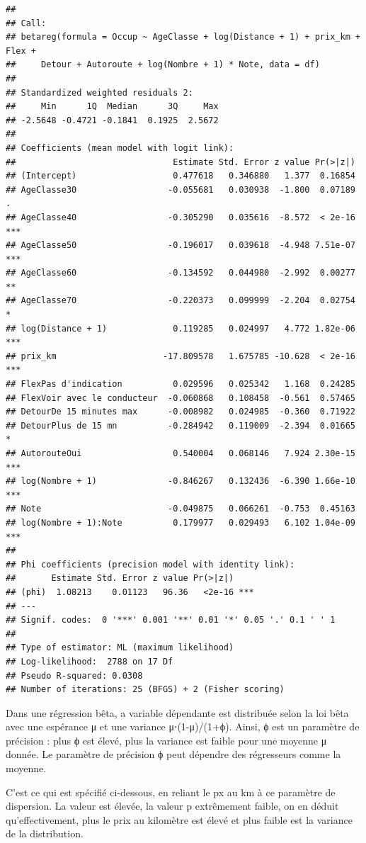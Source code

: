 \documentclass[
]{book}
\begin{document}
\begin{verbatim}
## 
## Call:
## betareg(formula = Occup ~ AgeClasse + log(Distance + 1) + prix_km + Flex + 
##     Detour + Autoroute + log(Nombre + 1) * Note, data = df)
## 
## Standardized weighted residuals 2:
##     Min      1Q  Median      3Q     Max 
## -2.5648 -0.4721 -0.1841  0.1925  2.5672 
## 
## Coefficients (mean model with logit link):
##                               Estimate Std. Error z value Pr(>|z|)    
## (Intercept)                   0.477618   0.346880   1.377  0.16854    
## AgeClasse30                  -0.055681   0.030938  -1.800  0.07189 .  
## AgeClasse40                  -0.305290   0.035616  -8.572  < 2e-16 ***
## AgeClasse50                  -0.196017   0.039618  -4.948 7.51e-07 ***
## AgeClasse60                  -0.134592   0.044980  -2.992  0.00277 ** 
## AgeClasse70                  -0.220373   0.099999  -2.204  0.02754 *  
## log(Distance + 1)             0.119285   0.024997   4.772 1.82e-06 ***
## prix_km                     -17.809578   1.675785 -10.628  < 2e-16 ***
## FlexPas d'indication          0.029596   0.025342   1.168  0.24285    
## FlexVoir avec le conducteur  -0.060868   0.108458  -0.561  0.57465    
## DetourDe 15 minutes max      -0.008982   0.024985  -0.360  0.71922    
## DetourPlus de 15 mn          -0.284942   0.119009  -2.394  0.01665 *  
## AutorouteOui                  0.540004   0.068146   7.924 2.30e-15 ***
## log(Nombre + 1)              -0.846267   0.132436  -6.390 1.66e-10 ***
## Note                         -0.049875   0.066261  -0.753  0.45163    
## log(Nombre + 1):Note          0.179977   0.029493   6.102 1.04e-09 ***
## 
## Phi coefficients (precision model with identity link):
##       Estimate Std. Error z value Pr(>|z|)    
## (phi)  1.08213    0.01123   96.36   <2e-16 ***
## ---
## Signif. codes:  0 '***' 0.001 '**' 0.01 '*' 0.05 '.' 0.1 ' ' 1 
## 
## Type of estimator: ML (maximum likelihood)
## Log-likelihood:  2788 on 17 Df
## Pseudo R-squared: 0.0308
## Number of iterations: 25 (BFGS) + 2 (Fisher scoring)
\end{verbatim}

Dans une régression bêta, a variable dépendante est distribuée selon la loi bêta avec une espérance μ et une variance μ⋅(1-μ)/(1+ϕ). Ainsi, ϕ est un paramètre de précision : plus ϕ est élevé, plus la variance est faible pour une moyenne μ donnée. Le paramètre de précision ϕ peut dépendre des régresseurs comme la moyenne.

C'est ce qui est spécifié ci-dessous, en reliant le px au km à ce paramètre de dispersion. La valeur est élevée, la valeur p extrêmement faible, on en déduit qu'effectivement, plus le prix au kilomètre est élevé et plus faible est la variance de la distribution.
\end{document}
